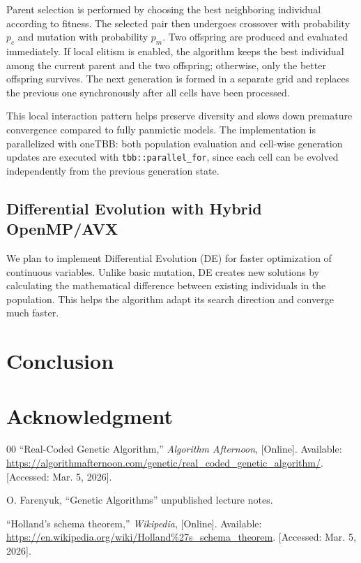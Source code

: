 \documentclass[conference]{IEEEtran}
\begin{document}
    Parent selection is performed by choosing the best neighboring individual according to fitness. The selected pair then undergoes crossover with probability $p_c$ and mutation with probability $p_m$. Two offspring are produced and evaluated immediately. If local elitism is enabled, the algorithm keeps the best individual among the current parent and the two offspring; otherwise, only the better offspring survives. The next generation is formed in a separate grid and replaces the previous one synchronously after all cells have been processed.

    This local interaction pattern helps preserve diversity and slows down premature convergence compared to fully panmictic models. The implementation is parallelized with oneTBB: both population evaluation and cell-wise generation updates are executed with \texttt{tbb::parallel\_for}, since each cell can be evolved independently from the previous generation state.

    \subsection{Differential Evolution with Hybrid OpenMP/AVX}
    We plan to implement Differential Evolution (DE) for faster optimization of continuous variables. Unlike basic mutation, DE creates new solutions by calculating the mathematical difference between existing individuals in the population. This helps the algorithm adapt its search direction and converge much faster.

    \section{Conclusion}

    \section*{Acknowledgment}

    \begin{thebibliography}{00}
         ``Real-Coded Genetic Algorithm,'' \textit{Algorithm Afternoon}, [Online]. Available: \url{https://algorithmafternoon.com/genetic/real_coded_genetic_algorithm/}. [Accessed: Mar. 5, 2026].
        
         O. Farenyuk, ``Genetic Algorithms'' unpublished lecture notes.

         ``Holland's schema theorem,'' \textit{Wikipedia}, [Online]. Available: \url{https://en.wikipedia.org/wiki/Holland%27s_schema_theorem}. [Accessed: Mar. 5, 2026].
    \end{thebibliography}
\end{document}
